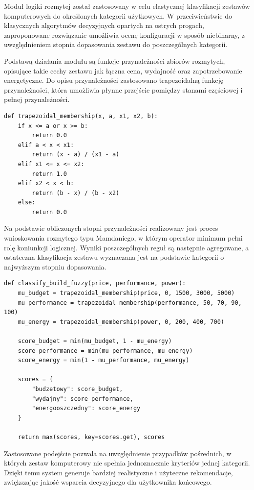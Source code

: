 \documentclass[a4paper,twoside,12pt]{book}
\begin{document}
Moduł logiki rozmytej został zastosowany w celu elastycznej klasyfikacji zestawów
komputerowych do określonych kategorii użytkowych. W przeciwieństwie do klasycznych
algorytmów decyzyjnych opartych na ostrych progach, zaproponowane rozwiązanie
umożliwia ocenę konfiguracji w sposób niebinarny, z uwzględnieniem stopnia
dopasowania zestawu do poszczególnych kategorii.

Podstawą działania modułu są funkcje przynależności zbiorów rozmytych, opisujące
takie cechy zestawu jak łączna cena, wydajność oraz zapotrzebowanie energetyczne.
Do opisu przynależności zastosowano trapezoidalną funkcję przynależności, która
umożliwia płynne przejście pomiędzy stanami częściowej i pełnej przynależności.

\begin{verbatim}
def trapezoidal_membership(x, a, x1, x2, b):
    if x <= a or x >= b:
        return 0.0
    elif a < x < x1:
        return (x - a) / (x1 - a)
    elif x1 <= x <= x2:
        return 1.0
    elif x2 < x < b:
        return (b - x) / (b - x2)
    else:
        return 0.0
\end{verbatim}

Na podstawie obliczonych stopni przynależności realizowany jest proces
wnioskowania rozmytego typu Mamdaniego, w którym operator minimum pełni rolę
koniunkcji logicznej. Wyniki poszczególnych reguł są następnie agregowane, a
ostateczna klasyfikacja zestawu wyznaczana jest na podstawie kategorii o
najwyższym stopniu dopasowania.

\begin{verbatim}
def classify_build_fuzzy(price, performance, power):
    mu_budget = trapezoidal_membership(price, 0, 1500, 3000, 5000)
    mu_performance = trapezoidal_membership(performance, 50, 70, 90, 100)
    mu_energy = trapezoidal_membership(power, 0, 200, 400, 700)

    score_budget = min(mu_budget, 1 - mu_energy)
    score_performance = min(mu_performance, mu_energy)
    score_energy = min(1 - mu_performance, mu_energy)

    scores = {
        "budzetowy": score_budget,
        "wydajny": score_performance,
        "energooszczedny": score_energy
    }

    return max(scores, key=scores.get), scores
\end{verbatim}

Zastosowane podejście pozwala na uwzględnienie przypadków pośrednich, w których
zestaw komputerowy nie spełnia jednoznacznie kryteriów jednej kategorii.
Dzięki temu system generuje bardziej realistyczne i użyteczne rekomendacje,
zwiększając jakość wsparcia decyzyjnego dla użytkownika końcowego.
\end{document}
